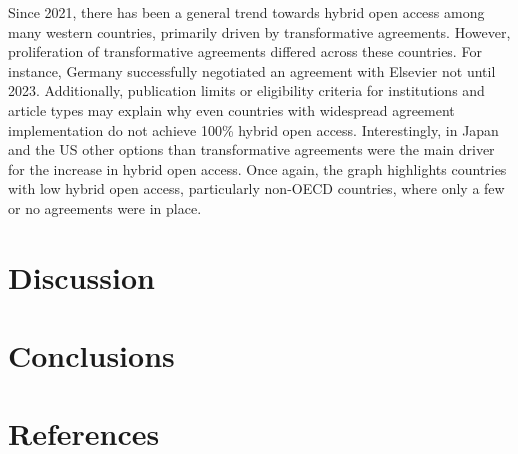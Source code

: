 \documentclass[a4paper,man,floatsintext,longtable,noextraspace,12pt]{apa6}
\begin{document}
Since 2021, there has been a general trend towards hybrid open access
among many western countries, primarily driven by transformative
agreements. However, proliferation of transformative agreements differed
across these countries. For instance, Germany successfully negotiated an
agreement with Elsevier not until 2023. Additionally, publication limits
or eligibility criteria for institutions and article types may explain
why even countries with widespread agreement implementation do not
achieve 100\% hybrid open access. Interestingly, in Japan and the US
other options than transformative agreements were the main driver for
the increase in hybrid open access. Once again, the graph highlights
countries with low hybrid open access, particularly non-OECD countries,
where only a few or no agreements were in place.

\hypertarget{discussion}{%
\section{Discussion}\label{discussion}}

\hypertarget{conclusions}{%
\section{Conclusions}\label{conclusions}}

\hypertarget{references}{%
\section*{References}\label{references}}
\end{document}
